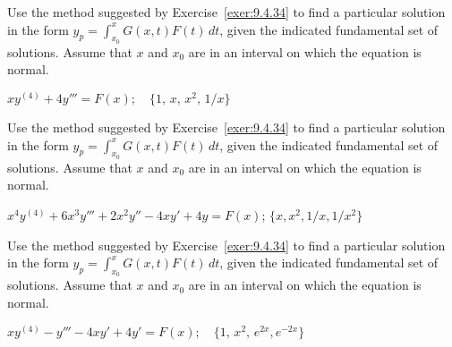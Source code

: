 \documentclass{ximera}
\begin{document}
\begin{problem}\label{exer:9.4.40}
Use the method suggested by Exercise~\ref{exer:9.4.34} to find a particular solution in the form
$y_p=\int_{x_0}^x G(x,t)F(t)\,dt$, given the indicated fundamental set of solutions.  Assume that $x$ and $x_0$ are in an interval on which
the equation is normal.

$xy^{(4)}+4y'''=F(x); \quad  \{1,\,x,\,x^2,\,1/x\}$
\end{problem}

\begin{problem}\label{exer:9.4.41}
Use the method suggested by Exercise~\ref{exer:9.4.34} to find a particular solution in the form
$y_p=\int_{x_0}^x G(x,t)F(t)\,dt$, given the indicated fundamental set of solutions.  Assume that $x$ and $x_0$ are in an interval on which
the equation is normal.

$x^4y^{(4)}+6x^3y'''+2x^2y''-4xy'+4y=F(x)$;\quad
$\{x,x^2,1/x,1/x^2\}$
\end{problem}

\begin{problem}\label{exer:9.4.42}
Use the method suggested by Exercise~\ref{exer:9.4.34} to find a particular solution in the form
$y_p=\int_{x_0}^x G(x,t)F(t)\,dt$, given the indicated fundamental set of solutions.  Assume that $x$ and $x_0$ are in an interval on which
the equation is normal.

$xy^{(4)}-y'''-4xy'+4y'=F(x); \quad \{1,\,x^2,\,e^{2x}, e^{-2x}\}$
\end{problem}
\end{document}
